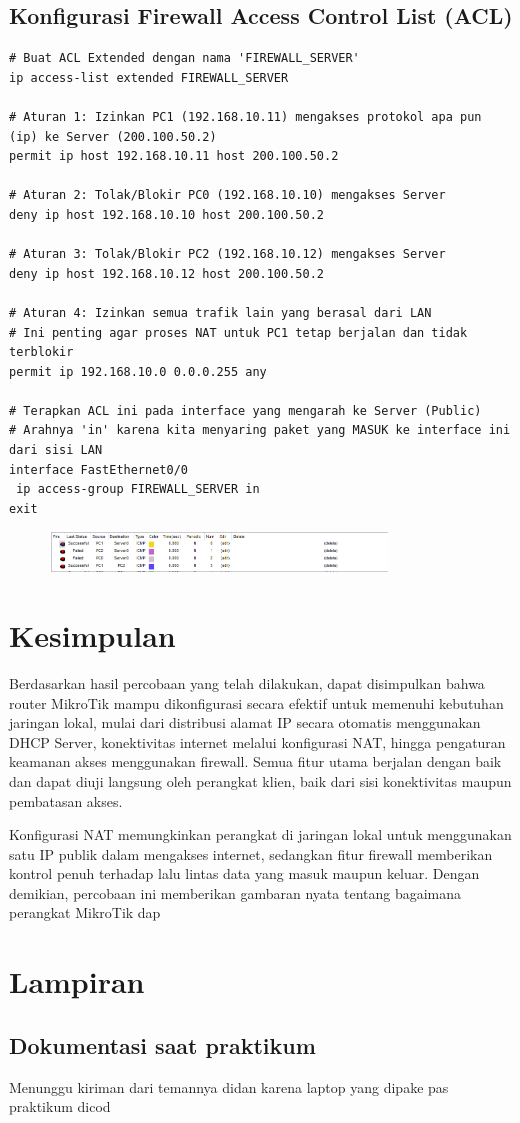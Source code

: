 \subsection{Konfigurasi Firewall Access Control List (ACL)}
\begin{lstlisting}
# Buat ACL Extended dengan nama 'FIREWALL_SERVER'
ip access-list extended FIREWALL_SERVER

# Aturan 1: Izinkan PC1 (192.168.10.11) mengakses protokol apa pun (ip) ke Server (200.100.50.2)
permit ip host 192.168.10.11 host 200.100.50.2

# Aturan 2: Tolak/Blokir PC0 (192.168.10.10) mengakses Server
deny ip host 192.168.10.10 host 200.100.50.2

# Aturan 3: Tolak/Blokir PC2 (192.168.10.12) mengakses Server
deny ip host 192.168.10.12 host 200.100.50.2

# Aturan 4: Izinkan semua trafik lain yang berasal dari LAN
# Ini penting agar proses NAT untuk PC1 tetap berjalan dan tidak terblokir
permit ip 192.168.10.0 0.0.0.255 any

# Terapkan ACL ini pada interface yang mengarah ke Server (Public)
# Arahnya 'in' karena kita menyaring paket yang MASUK ke interface ini dari sisi LAN
interface FastEthernet0/0
 ip access-group FIREWALL_SERVER in
exit
\end{lstlisting}
\begin{figure}[H]
\centering
\includegraphics[width=0.8\textwidth]{P1/img/1.png}
\end{figure}
\section{Kesimpulan}

Berdasarkan hasil percobaan yang telah dilakukan, dapat disimpulkan bahwa router MikroTik mampu dikonfigurasi secara efektif untuk memenuhi kebutuhan jaringan lokal, mulai dari distribusi alamat IP secara otomatis menggunakan DHCP Server, konektivitas internet melalui konfigurasi NAT, hingga pengaturan keamanan akses menggunakan firewall. Semua fitur utama berjalan dengan baik dan dapat diuji langsung oleh perangkat klien, baik dari sisi konektivitas maupun pembatasan akses.

Konfigurasi NAT memungkinkan perangkat di jaringan lokal untuk menggunakan satu IP publik dalam mengakses internet, sedangkan fitur firewall memberikan kontrol penuh terhadap lalu lintas data yang masuk maupun keluar. Dengan demikian, percobaan ini memberikan gambaran nyata tentang bagaimana perangkat MikroTik dap
\section{Lampiran}
\subsection{Dokumentasi saat praktikum}
Menunggu kiriman dari temannya didan karena laptop yang dipake pas praktikum dicod